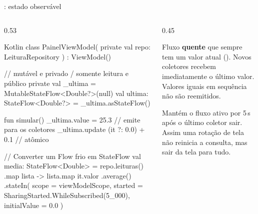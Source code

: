 \documentclass[aspectratio=169,10pt]{beamer}
\begin{document}
\begin{frame}[fragile]{: estado observável}
  \begin{columns}[T]
    \begin{column}{0.53\textwidth}
\begin{codigo}[title=Padrão do ViewModel]{Kotlin}
class PainelViewModel(
  private val repo: LeituraRepository
) : ViewModel() {
  // mutável e privado / somente leitura e público
  private val _ultima = MutableStateFlow<Double?>(null)
  val ultima: StateFlow<Double?> = _ultima.asStateFlow()

  fun simular() {
    _ultima.value = 25.3     // emite para os coletores
    _ultima.update { (it ?: 0.0) + 0.1 }  // atômico
  }

  // Converter um Flow frio em StateFlow
  val media: StateFlow<Double> = repo.leituras()
    .map { lista -> lista.map { it.valor }.average() }
    .stateIn(
      scope = viewModelScope,
      started = SharingStarted.WhileSubscribed(5_000),
      initialValue = 0.0
    )
}
\end{codigo}
    \end{column}
    \begin{column}{0.45\textwidth}
      \begin{conceito}[StateFlow]
        Fluxo \textbf{quente} que sempre tem um valor atual (). Novos coletores recebem imediatamente o último valor. Valores iguais em sequência não são reemitidos.
      \end{conceito}
      \begin{dica}
        Mantém o fluxo ativo por 5\,s após o último coletor sair. Assim uma rotação de tela não reinicia a consulta, mas sair da tela para tudo.
      \end{dica}
      \begin{conceito}[Na UI (Módulo 05)]
        \\
      \end{conceito}
    \end{column}
  \end{columns}
\end{frame}
\end{document}
